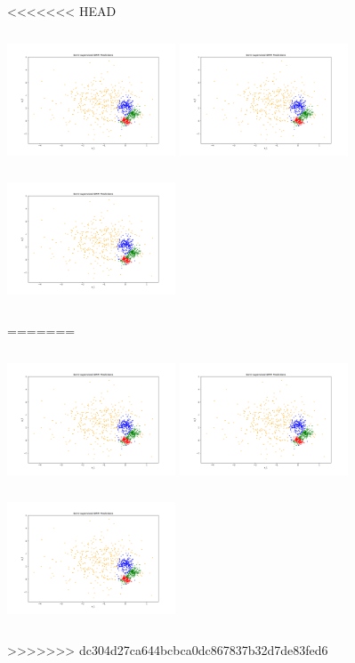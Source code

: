 <<<<<<< HEAD
\begin{answer}
\includegraphics[width=5cm, height=4cm]{pred_ss_0.pdf}
\includegraphics[width=5cm, height=4cm]{pred_ss_1.pdf}
\includegraphics[width=5cm, height=4cm]{pred_ss_2.pdf}
\end{answer}
=======
\begin{answer}
\includegraphics[width=5cm, height=4cm]{pred_ss_0.pdf}
\includegraphics[width=5cm, height=4cm]{pred_ss_1.pdf}
\includegraphics[width=5cm, height=4cm]{pred_ss_2.pdf}
\end{answer}
>>>>>>> dc304d27ca644bcbca0dc867837b32d7de83fed6
